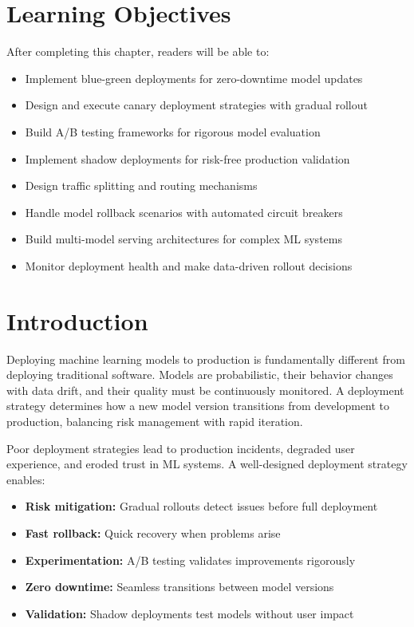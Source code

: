 \section{Learning Objectives}

After completing this chapter, readers will be able to:
\begin{itemize}
    \item Implement blue-green deployments for zero-downtime model updates
    \item Design and execute canary deployment strategies with gradual rollout
    \item Build A/B testing frameworks for rigorous model evaluation
    \item Implement shadow deployments for risk-free production validation
    \item Design traffic splitting and routing mechanisms
    \item Handle model rollback scenarios with automated circuit breakers
    \item Build multi-model serving architectures for complex ML systems
    \item Monitor deployment health and make data-driven rollout decisions
\end{itemize}

\section{Introduction}

Deploying machine learning models to production is fundamentally different from deploying traditional software. Models are probabilistic, their behavior changes with data drift, and their quality must be continuously monitored. A deployment strategy determines how a new model version transitions from development to production, balancing risk management with rapid iteration.

Poor deployment strategies lead to production incidents, degraded user experience, and eroded trust in ML systems. A well-designed deployment strategy enables:

\begin{itemize}
    \item \textbf{Risk mitigation:} Gradual rollouts detect issues before full deployment
    \item \textbf{Fast rollback:} Quick recovery when problems arise
    \item \textbf{Experimentation:} A/B testing validates improvements rigorously
    \item \textbf{Zero downtime:} Seamless transitions between model versions
    \item \textbf{Validation:} Shadow deployments test models without user impact
\end{itemize}

